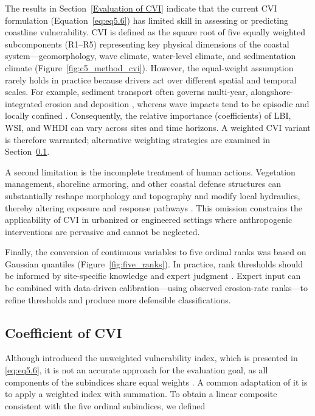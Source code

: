 The results in Section~\ref{Evaluation of CVI} indicate that the current CVI
formulation (Equation~\ref{eq:eq5.6}) has limited skill in assessing or
predicting coastline vulnerability. CVI is defined as the square root of five
equally weighted subcomponents (R1–R5) representing key physical dimensions of
the coastal system—geomorphology, wave climate, water-level climate, and
sedimentation climate (Figure~\ref{fig:c5_method_cvi}). However, the
equal-weight assumption rarely holds in practice because drivers act over
different spatial and temporal scales. For example, sediment transport often
governs multi-year, alongshore-integrated erosion and deposition
\citep[e.g.,][]{davidson-arnott_wave_1980,chowdhury_effect_2017,penrod2023multidecadal,kabuth_wave_2014,hapke_review_2010},
whereas wave impacts tend to be episodic and locally confined
\citep{swenson_bluff_2006}. Consequently, the relative importance (coefficients)
of LBI, WSI, and WHDI can vary across sites and time horizons. A weighted CVI
variant is therefore warranted; alternative weighting strategies are examined in
Section~\ref{Coefficient of CVI}.

A second limitation is the incomplete treatment of human actions. Vegetation
management, shoreline armoring, and other coastal defense structures can
substantially reshape morphology and topography and modify local hydraulics,
thereby altering exposure and response pathways
\citep{nordstrom2014living,jackson2015beach,sanitwong2023environmental}. This
omission constrains the applicability of CVI in urbanized or engineered settings
where anthropogenic interventions are pervasive and cannot be neglected.

Finally, the conversion of continuous variables to five ordinal ranks was based
on Gaussian quantiles (Figure~\ref{fig:five_ranks}). In practice, rank
thresholds should be informed by site-specific knowledge and expert judgment
\citep[e.g.,][]{fu2022characteristics,gornitz_global_1991,anfuso_coastal_2021}.
Expert input can be combined with data-driven calibration—using observed
erosion-rate ranks—to refine thresholds and produce more defensible
classifications.

\subsection{Coefficient of CVI}
\label{Coefficient of CVI}



Although \citet{gornitz_global_1991} introduced the unweighted vulnerability
index, which is presented in \ref{eq:eq5.6}, it is not an accurate approach for
the evaluation goal, as all components of the subindices share equal weights
\citet{fu2022characteristics}. A common adaptation of it is to apply a weighted
index with summation. To obtain a linear composite consistent with the five
ordinal subindices, we defined

